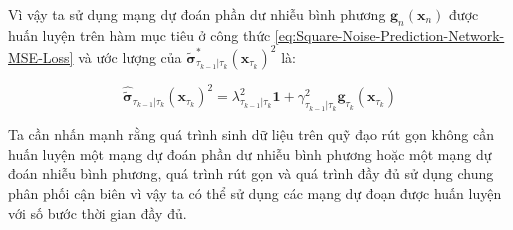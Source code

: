 \documentclass[14pt, a4paper]{article}
\numberwithin{equation}{section}
\numberwithin{figure}{section}
\numberwithin{dl}{section}
\numberwithin{md}{section}
\numberwithin{bd}{section}
\numberwithin{dn}{section}
\numberwithin{hq}{section}
\begin{document}
    Vì vậy ta sử dụng mạng dự đoán phần dư nhiễu bình phương $\boldsymbol{g}_n (\boldsymbol{x}_n)$ được huấn luyện trên hàm mục tiêu ở công thức \ref{eq:Square-Noise-Prediction-Network-MSE-Loss} và ước lượng của $\tilde{\boldsymbol{\sigma}}_{\tau_{k-1} \vert \tau_k}^{\ast} (\boldsymbol{x}_{\tau_k})^2$ là:

    \begin{equation}
        \hat{\tilde{\boldsymbol{\sigma}}}_{\tau_{k-1} \vert \tau_k} (\boldsymbol{x}_{\tau_k})^2 = \lambda_{\tau_{k-1} \vert \tau_k}^2 \boldsymbol{1} + \gamma_{\tau_{k-1} \vert \tau_k}^2 \boldsymbol{g}_{\tau_k} (\boldsymbol{x}_{\tau_k})
    \end{equation}

    Ta cần nhấn mạnh rằng quá trình sinh dữ liệu trên quỹ đạo rút gọn không cần huấn luyện một mạng dự đoán phần dư nhiễu bình phương hoặc một mạng dự đoán nhiễu bình phương, quá trình rút gọn và quá trình đầy đủ sử dụng chung phân phối cận biên vì vậy ta có thể sử dụng các mạng dự đoạn được huấn luyện với số bước thời gian đầy đủ.
\end{document}
